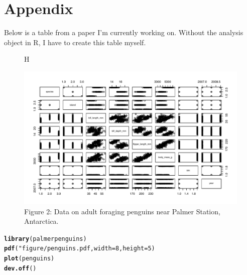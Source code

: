\documentclass{article}\usepackage[]{graphicx}\usepackage[]{xcolor}
\makeatletter
\newcommand{\hlkwd}[1]{\textcolor[rgb]{0.737,0.353,0.396}{\textbf{#1}}}%
\newenvironment{kframe}{%
 \def\at@end@of@kframe{}%
 \ifinner\ifhmode%
  \def\at@end@of@kframe{\end{minipage}}%
  \begin{minipage}{\columnwidth}%
 \fi\fi%
 \def\FrameCommand##1{\hskip\@totalleftmargin \hskip-\fboxsep
 \colorbox{shadecolor}{##1}\hskip-\fboxsep
     \hskip-\linewidth \hskip-\@totalleftmargin \hskip\columnwidth}%
 \MakeFramed {\advance\hsize-\width
   \@totalleftmargin\z@ \linewidth\hsize
   \@setminipage}}%
 {\par\unskip\endMakeFramed%
 \at@end@of@kframe}
\newenvironment{knitrout}{}{} %
\makeatother
\begin{document}
\newpage
\onecolumn
\section{Appendix}
Below is a table from a paper I’m currently working on. Without the analysis object in R, I have to create this table myself.

\begin{figure}{H}
  \begin{center}
    \includegraphics[scale=0.8]{figure/penguins.pdf}
    \caption{Figure 2: Data on adult foraging penguins near Palmer Station, Antarctica.}
  \label{penguinsplot}
  \end{center}
\end{figure}
\begin{knitrout}\scriptsize
{}\color{fgcolor}\begin{kframe}
\begin{alltt}
\hlkwd{library}(palmerpenguins)
\hlkwd{pdf}("figure/penguins.pdf, width = 8, height = 5)
\hlkwd{plot}(penguins)
\hlkwd{dev.off}()
\end{alltt}


{\ttfamily\noindent\bfseries{}}\end{kframe}
\end{knitrout}
\end{document}
